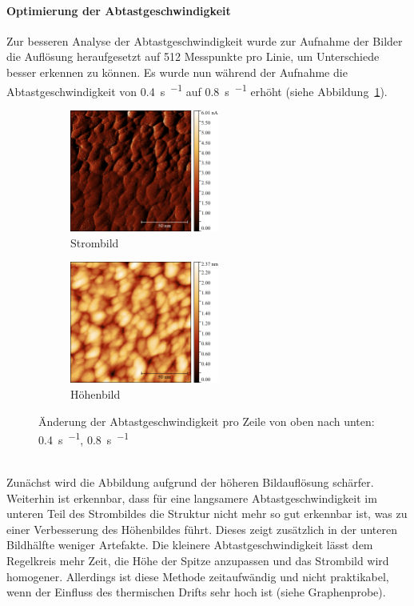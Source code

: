 \documentclass[a4paper,twoside,final]{article}
\begin{document}
\paragraph{Optimierung der Abtastgeschwindigkeit}
Zur besseren Analyse der Abtastgeschwindigkeit wurde zur Aufnahme der Bilder die Auflösung heraufgesetzt auf 512 Messpunkte pro Linie, um Unterschiede besser erkennen zu können.
Es wurde nun während der Aufnahme die Abtastgeschwindigkeit von \SI{0.4}{\second\per{}} auf \SI{0.8}{\second\per{}} erhöht (siehe Abbildung~\ref{fig:Abtastgeschwindigkeit}).
\begin{figure}[htp]
    \centering
    \begin{subfigure}{0.45\textwidth}
        \includegraphics[height=4cm]{Bilder/Image01982_ppl512_Strom.pdf}
        \caption{Strombild}
    \end{subfigure}
    \hspace{0.5cm}
    \begin{subfigure}{0.45\textwidth}
        \includegraphics[height=4cm]{Bilder/Image01982_ppl512.pdf}
        \caption{Höhenbild}
    \end{subfigure}
    \caption{Änderung der Abtastgeschwindigkeit pro Zeile von oben nach unten: \SI{0,4}{\second\per{}}, \SI{0.8}{\second\per{}}}
    \label{fig:Abtastgeschwindigkeit}
\end{figure}\\
Zunächst wird die Abbildung aufgrund der höheren Bildauflösung schärfer. Weiterhin ist erkennbar, dass für eine langsamere Abtastgeschwindigkeit im unteren Teil des Strombildes die Struktur nicht mehr so gut erkennbar ist, was zu einer Verbesserung des Höhenbildes führt. Dieses zeigt zusätzlich in der unteren Bildhälfte weniger Artefakte. Die kleinere Abtastgeschwindigkeit lässt dem Regelkreis mehr Zeit, die Höhe der Spitze anzupassen und das Strombild wird homogener. Allerdings ist diese Methode zeitaufwändig und nicht praktikabel, wenn der Einfluss des thermischen Drifts sehr hoch ist (siehe Graphenprobe).\\
\end{document}
